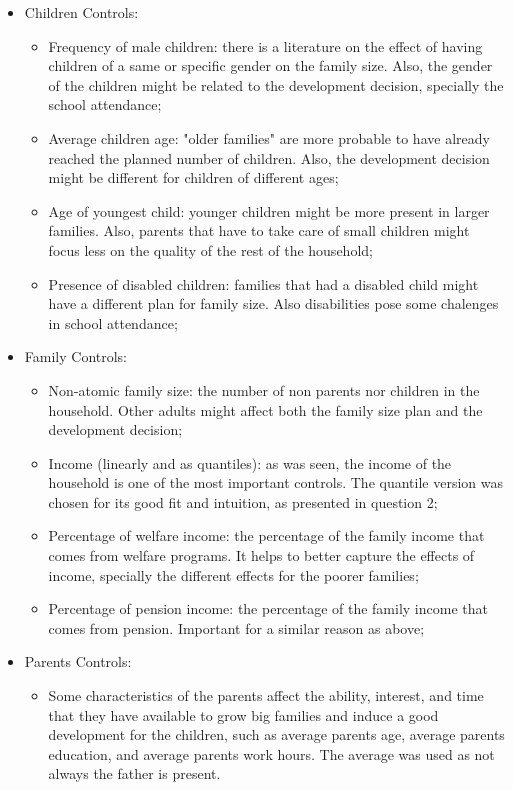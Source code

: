 \documentclass[12pt]{article}
\begin{document}
\begin{itemize}
    \item Children Controls:
    \begin{itemize}
        \item Frequency of male children: there is a literature on the effect of having children of a same or specific gender on the family size. Also, the gender of the children might be related to the development decision, specially the school attendance;
        \item Average children age: "older families" are more probable to have already reached the planned number of children. Also,  the development decision might be different for children of different ages;
        \item Age of youngest child: younger children might be more present in larger families. Also, parents that have to take care of small children might focus less on the quality of the rest of the household;
        \item Presence of disabled children: families that had a disabled child might have a different plan for family size. Also disabilities pose some chalenges in school attendance;
    \end{itemize}
    \item Family Controls:
    \begin{itemize}
        \item Non-atomic family size: the number of non parents nor children in the household. Other adults might affect both the family size plan and the development decision;
        \item Income (linearly and as quantiles): as was seen, the income of the household is one of the most important controls. The quantile version was chosen for its good fit and intuition, as presented in question 2;
        \item Percentage of welfare income: the percentage of the family income that comes from welfare programs. It helps to better capture the effects of income, specially the different effects for the poorer families;
        \item Percentage of pension income: the percentage of the family income that comes from pension. Important for a similar reason as above;
    \end{itemize}
    \item Parents Controls:
    \begin{itemize}
        \item Some characteristics of the parents affect the ability, interest, and time that they have available to grow big families and induce a good development for the children, such as average parents age, average parents education, and average parents work hours. The average was used as not always the father is present.

\end{itemize}
\end{itemize}
\end{document}
